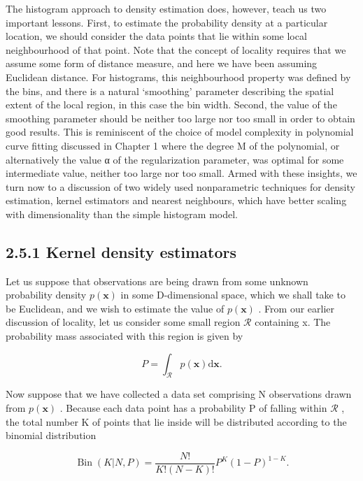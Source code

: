 \documentclass[
  10
]{article}
\begin{document}
The histogram approach to density estimation does, however, teach us two
important lessons. First, to estimate the probability density at a
particular location, we should consider the data points that lie within
some local neighbourhood of that point. Note that the concept of
locality requires that we assume some form of distance measure, and here
we have been assuming Euclidean distance. For histograms, this
neighbourhood property was defined by the bins, and there is a natural
`smoothing' parameter describing the spatial extent of the local region,
in this case the bin width. Second, the value of the smoothing parameter
should be neither too large nor too small in order to obtain good
results. This is reminiscent of the choice of model complexity in
polynomial curve fitting discussed in Chapter 1 where the degree M of
the polynomial, or alternatively the value α of the regularization
parameter, was optimal for some intermediate value, neither too large
nor too small. Armed with these insights, we turn now to a discussion of
two widely used nonparametric techniques for density estimation, kernel
estimators and nearest neighbours, which have better scaling with
dimensionality than the simple histogram model.

\subsection{2.5.1 Kernel density
estimators}\label{kernel-density-estimators}

Let us suppose that observations are being drawn from some unknown
probability density \(p ( \mathbf { x } )\) in some D-dimensional space,
which we shall take to be Euclidean, and we wish to estimate the value
of \(p ( \mathbf { x } )\) . From our earlier discussion of locality,
let us consider some small region \(\mathcal { R }\) containing x. The
probability mass associated with this region is given by

\[
P = \int_ {\mathcal {R}} p (\mathbf {x}) \mathrm{d} \mathbf {x}.\tag{2.242}
\]

Now suppose that we have collected a data set comprising N observations
drawn from \(p ( \mathbf { x } )\) . Because each data point has a
probability P of falling within \(\mathcal { R }\) , the total number K
of points that lie inside will be distributed according to the binomial
distribution

\[
\operatorname{Bin} (K | N, P) = \frac {N !}{K ! (N - K) !} P ^ {K} (1 - P) ^ {1 - K}.\tag{2.243}
\]
\end{document}

